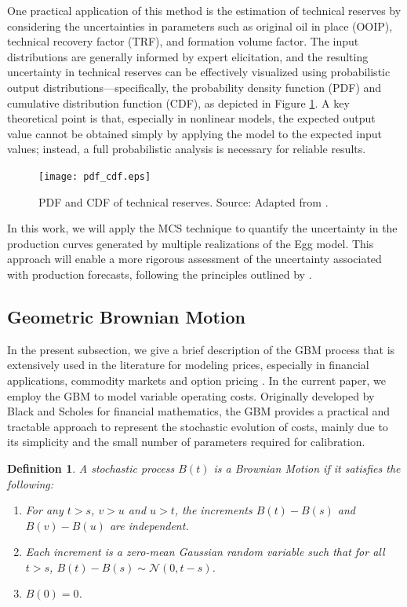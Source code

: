 \documentclass[pdflatex,sn-basic]{sn-jnl}%
\theoremstyle{thmstyleone}%
\theoremstyle{thmstyletwo}%
\theoremstyle{thmstylethree}%
\newtheorem{definition}{Definition}%
\begin{document}
One practical application of this method is the estimation of technical reserves by considering the uncertainties in parameters such as original oil in place (OOIP), technical recovery factor (TRF), and formation volume factor. The input distributions are generally informed by expert elicitation, and the resulting uncertainty in technical reserves can be effectively visualized using probabilistic output distributions—specifically, the probability density function (PDF) and cumulative distribution function (CDF), as depicted in Figure \ref{fig7}. A key theoretical point is that, especially in nonlinear models, the expected output value cannot be obtained simply by applying the model to the expected input values; instead, a full probabilistic analysis is necessary for reliable results.

\begin{figure}[H]
\centering
\begin{minipage}{0.85\textwidth}
  \texttt{[image: pdf\_cdf.eps]}
  \caption{PDF and CDF of technical reserves. Source: Adapted from \cite{ref24}.}
  \label{fig7}
\end{minipage}
\end{figure}

In this work, we will apply the MCS technique to quantify the uncertainty in the production curves generated by multiple realizations of the Egg model. This approach will enable a more rigorous assessment of the uncertainty associated with production forecasts, following the principles outlined by \cite{ref24}. 

\subsection{Geometric Brownian Motion}\label{subsec43}

In the present subsection, we give a brief description of the GBM process that is extensively used in the literature for modeling prices, especially in financial applications, commodity markets and option pricing \citep{ref25}. In the current paper, we employ the GBM to model variable operating costs. Originally developed by Black and Scholes for financial mathematics, the GBM provides a practical and tractable approach to represent the stochastic evolution of costs, mainly due to its simplicity and the small number of parameters required for calibration. 

\begin{definition}
A stochastic process $B(t)$ is a Brownian Motion if it satisfies the following:
\begin{enumerate}[label=(\roman*)]
    \item For any $t > s$, $v > u$ and $u > t$, the increments $B(t) - B(s)$ and $B(v) - B(u)$ are independent.
    \item Each increment is a zero-mean Gaussian random variable such that for all $t > s$, $B(t) - B(s) \sim \mathcal{N}(0, t-s)$.
    \item $B(0) = 0$.
\end{enumerate}
\end{definition}
\end{document}
